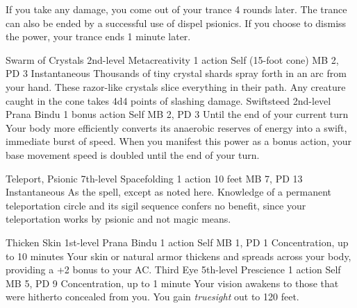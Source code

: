 If you take any damage, you come out of your trance 4 rounds
later. The trance can also be ended by a successful use of
dispel psionics. If you choose to dismiss the power, your
trance ends 1 minute later.

\DndPowerHeader%
    {Swarm of Crystals\label{pwr:swarm_of_crystals}}
    {2nd-level Metacreativity}
    {1 action}
    {Self (15-foot cone)}
    {MB 2, PD 3}
    {Instantaneous}
Thousands of tiny crystal shards spray forth
in an arc from your hand. These razor-like crystals slice
everything in their path. Any creature caught in the cone
takes 4d4 points of slashing damage.
\DndPowerHeader%
    {Swiftsteed\label{pwr:swiftsteed}}
    {2nd-level Prana Bindu}
    {1 bonus action}
    {Self}
    {MB 2, PD 3}
    {Until the end of your current turn}
Your body more efficiently converts its anaerobic
reserves of energy into a swift, immediate burst of speed.
When you manifest this power as a bonus action, your base
movement speed is doubled until the end of your turn.

\DndPowerHeader%
    {Teleport, Psionic\label{pwr:teleport_psionic}}
    {7th-level Spacefolding}
    {1 action}
    {10 feet}
    {MB 7, PD 13}
    {Instantaneous}
As the  spell,
except as noted here.
Knowledge of a permanent teleportation circle and
its sigil sequence confers no benefit,
since your teleportation works by psionic 
and not magic means.

\DndPowerHeader%
    {Thicken Skin\label{pwr:thicken_skin}}
    {1st-level Prana Bindu}
    {1 action}
    {Self}
    {MB 1, PD 1}
    {Concentration, up to 10 minutes}
Your skin or natural armor thickens and spreads
across your body, providing a +2 bonus to your AC.
\DndPowerHeader%
    {Third Eye\label{pwr:third_eye}}
    {5th-level Prescience}
    {1 action}
    {Self}
    {MB 5, PD 9}
    {Concentration, up to 1 minute}
Your vision awakens to those that were hitherto
concealed from you. You gain \emph{truesight} out to 120 feet.

